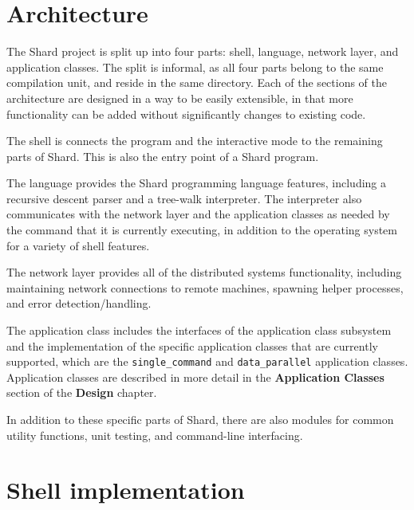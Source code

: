 \documentclass[twoside]{report}
\newcommand{\todoi}[1]{\todo[inline, color=blue!20]{TODO: {#1}}}
\begin{document}
\section{Architecture}


The Shard project is split up into four parts: shell, language, network layer, and application classes. The split is informal, as all four parts belong to the same compilation unit, and reside in the same directory.
Each of the sections of the architecture are designed in a way to be easily extensible, in that more functionality can be added without significantly changes to existing code.

The shell is connects the program and the interactive mode to the remaining parts of Shard. This is also the entry point of a Shard program.

The language provides the Shard programming language features, including a recursive descent parser and a tree-walk interpreter. The interpreter also communicates with the network layer and the application classes as needed by the command that it is currently executing, in addition to the operating system for a variety of shell features.

The network layer provides all of the distributed systems functionality, including maintaining network connections to remote machines, spawning helper processes, and error detection/handling.

The application class includes the interfaces of the application class subsystem and the implementation of the specific application classes that are currently supported, which are the \texttt{single\_command} and \texttt{data\_parallel} application classes. Application classes are described in more detail in the \textbf{Application Classes} section of the \textbf{Design} chapter.


In addition to these specific parts of Shard, there are also modules for common utility functions, unit testing, and command-line interfacing.

\section{Shell implementation}
\end{document}
